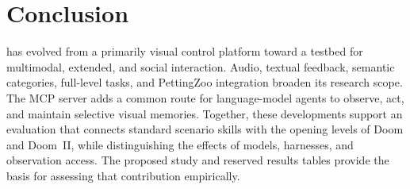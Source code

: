 \section{Conclusion}
\vzd{} has evolved from a primarily visual control platform toward a testbed for multimodal, extended, and social interaction. Audio, textual feedback, semantic categories, full-level tasks, and PettingZoo integration broaden its research scope. The MCP server adds a common route for language-model agents to observe, act, and maintain selective visual memories. Together, these developments support an evaluation that connects standard scenario skills with the opening levels of Doom and Doom~II, while distinguishing the effects of models, harnesses, and observation access. The proposed study and reserved results tables provide the basis for assessing that contribution empirically.
